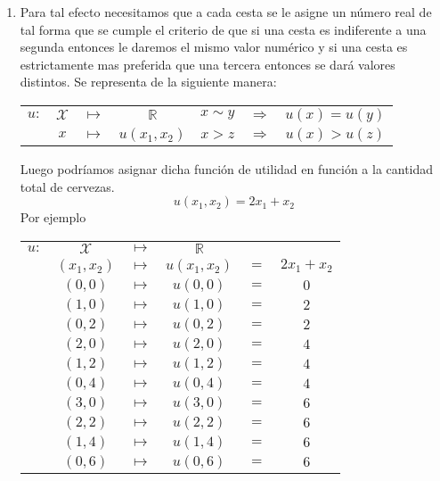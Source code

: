 \begin{enumerate}
	\begin{enumerate}[\bfseries (3.1)]
	    \item Para tal efecto necesitamos que a cada cesta se le asigne un número real de tal forma que se cumple el criterio de que si una cesta es indiferente a una segunda entonces le daremos el mismo valor numérico y si una cesta es estrictamente mas preferida que una tercera entonces se dará valores distintos. Se representa de la siguiente manera:     
		\begin{center}
		    \begin{tabular}{rccc|ccc}
			$u:$&$\mathcal{X}$ & $\longmapsto$ & $\mathbb{R}$ & $x \sim y$ & $\Rightarrow$ & $u(x)=u(y)$\\
			    & $x$ & $\longmapsto$ & $u(x_1,x_2)$ & $x>z$&$\Rightarrow$&$u(x)>u(z)$\\
		    \end{tabular}
		\end{center}
		\vspace{.3cm}
		Luego podríamos asignar dicha función de utilidad en función a la cantidad total de cervezas. 
		$$u(x_1,x_2)=2x_1+x_2$$
		Por ejemplo

		\begin{center}
		    \begin{tabular}{cccccc}
			$u:$&$\mathcal{X}$&$\longmapsto$&$\mathbb{R}$&&\\
			 & $(x_1,x_2)$ & $\longmapsto$&$u(x_1,x_2)$&$=$&$2x_1+x_2$\\
			    & $(0,0)$ & $\longmapsto$ & $u(0,0)$ & $=$ & $0$\\
			    & $(1,0)$ & $\longmapsto$ & $u(1,0)$ & $=$ & $2$\\
			    & $(0,2)$ & $\longmapsto$ & $u(0,2)$ & $=$ & $2$\\
			    & $(2,0)$ & $\longmapsto$ & $u(2,0)$ & $=$ & $4$\\
			    & $(1,2)$ & $\longmapsto$ & $u(1,2)$ & $=$ & $4$\\
			    & $(0,4)$ & $\longmapsto$ & $u(0,4)$ & $=$ & $4$\\
			    & $(3,0)$ & $\longmapsto$ & $u(3,0)$ & $=$ & $6$\\
			    & $(2,2)$ & $\longmapsto$ & $u(2,2)$ & $=$ & $6$\\
			    & $(1,4)$ & $\longmapsto$ & $u(1,4)$ & $=$ & $6$\\
			    & $(0,6)$ & $\longmapsto$ & $u(0,6)$ & $=$ & $6$\\
		    \end{tabular}
		\end{center} 
		\vspace{.5cm}


\end{enumerate}
\end{enumerate}
